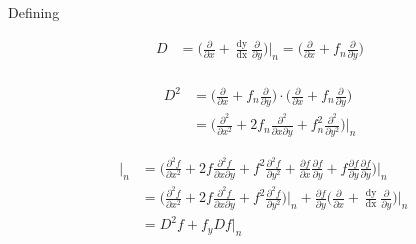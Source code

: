 \documentclass[12 pt]{article}
\begin{document}
Defining 
{\large

\begin{equation*}
\begin{split}
D &= \bigg(\frac{\partial }{\partial x} + {\frac{\mathop{\mathrm{dy}}}{\mathop{\mathrm{dx}}}}\frac{\partial }{\partial y}\bigg)\Big\vert_{n} = \bigg(\frac{\partial }{\partial x} + f_{n}\frac{\partial }{\partial y}\bigg)\\
\end{split}
\end{equation*}
}

{
\large
\begin{equation}
\begin{split}
D^{2} &= \bigg(\frac{\partial }{\partial x} + f_{n}\frac{\partial }{\partial y}\bigg)\cdot \bigg(\frac{\partial }{\partial x} + f_{n}\frac{\partial }{\partial y}\bigg)\\
	  &= \Big(\frac{\partial^{2}}{\partial x^{2}} + 2f_{n}\frac{\partial^{2}}{\partial x \partial y} + f_{n}^{2}\frac{\partial^{2}}{\partial y^{2}}\Big)\Big\vert_{n}
\end{split}
\end{equation}
}

{
\large
\begin{equation*}
\begin{split}
\frac{\mathop{\mathrm{d^{2}f}}}{\mathop{\mathrm{dx^{2}}}}\Big\vert_{n} &= \Big(\frac{\partial^{2}f}{\partial x^{2}} + 2f\frac{\partial^{2}f}{\partial x \partial y} + f^{2}\frac{\partial^{2}f}{\partial y^{2}} + \frac{\partial f}{\partial x}\frac{\partial f}{\partial y} + f\frac{\partial f}{\partial y}\frac{\partial f}{\partial y}\Big)\Big\vert_{n}\\
																	   &= \Big(\frac{\partial^{2}f}{\partial x^{2}} + 2f\frac{\partial^{2}f}{\partial x \partial y} + f^{2}\frac{\partial^{2}f}{\partial y^{2}}\Big)\Big\vert_{n} + \frac{\partial f}{\partial y}\bigg(\frac{\partial }{\partial x} + \frac{\mathop{\mathrm{dy}}}{\mathop{\mathrm{dx}}}\frac{\partial }{\partial y}\bigg)\Big\vert_{n}\\
																	   &= D^{2}f+f_{y}Df\Big\vert_{n}\\																   
\end{split}
\end{equation*}

}
\end{document}
